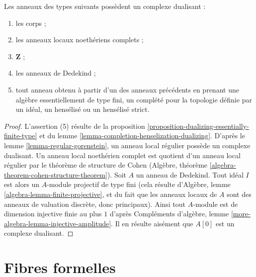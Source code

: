 \begin{lemma}
\label{lemma-ubiquity-dualizing}
Les anneaux des types suivants possèdent un complexe dualisant :
\begin{enumerate}
\item les corps ;
\item les anneaux locaux noethériens complets ;
\item $\mathbf{Z}$ ;
\item les anneaux de Dedekind ;
\item tout anneau obtenu à partir d'un des anneaux précédents
en prenant une algèbre essentiellement de type fini, un complété
pour la topologie définie par un idéal, un hensélisé ou un hensélisé strict.
\end{enumerate}
\end{lemma}

\begin{proof}
L'assertion (5) résulte de la proposition \ref{proposition-dualizing-essentially-finite-type} et du lemme \ref{lemma-completion-henselization-dualizing}.
D'après le lemme \ref{lemma-regular-gorenstein}, un anneau local régulier possède un complexe dualisant.
Un anneau local noethérien complet est quotient d'un anneau local régulier
par le théorème de structure de Cohen (Algèbre, théorème \ref{algebra-theorem-cohen-structure-theorem}).
Soit $A$ un anneau de Dedekind. Tout idéal $I$ est alors un
$A$-module projectif de type fini (cela résulte d'Algèbre, lemme \ref{algebra-lemma-finite-projective},
et du fait que les anneaux locaux de $A$ sont des anneaux
de valuation discrète, donc principaux).
Ainsi tout $A$-module est de dimension injective finie au plus $1$
d'après Compléments d'algèbre, lemme \ref{more-algebra-lemma-injective-amplitude}.
Il en résulte aisément que $A[0]$ est un complexe dualisant.
\end{proof}





\section{Fibres formelles}
\label{section-formal-fibres}

